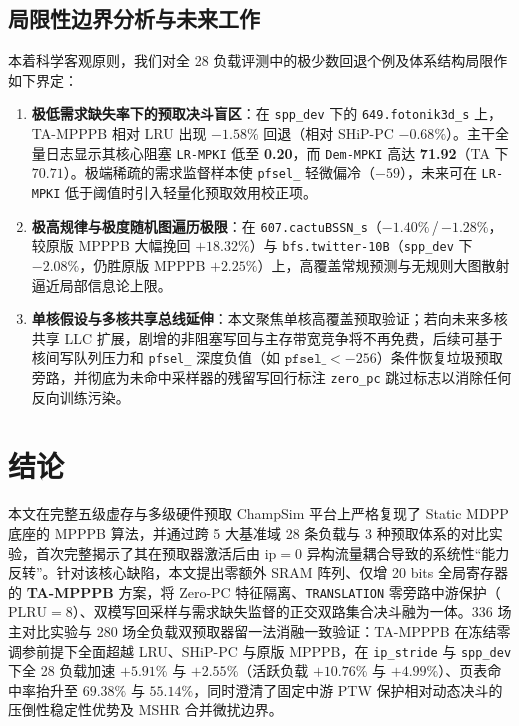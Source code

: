 \documentclass[10.5pt,compsoc,UTF8]{CjC}
\begin{document}
\subsection{局限性边界分析与未来工作}

本着科学客观原则，我们对全 28 负载评测中的极少数回退个例及体系结构局限作如下界定：
\begin{enumerate}
  \item \textbf{极低需求缺失率下的预取决斗盲区}：在 \texttt{spp\_dev} 下的 \texttt{649.\allowbreak fotonik3d\_s} 上，TA-MPPPB 相对 LRU 出现 $-1.58\%$ 回退（相对 SHiP-PC $-0.68\%$）。主干全量日志显示其核心阻塞 \texttt{LR-MPKI} 低至 \textbf{0.20}，而 \texttt{Dem-MPKI} 高达 \textbf{71.92}（TA 下 $70.71$）。极端稀疏的需求监督样本使 \texttt{pfsel\_} 轻微偏冷（$-59$），未来可在 \texttt{LR-MPKI} 低于阈值时引入轻量化预取效用校正项。
  \item \textbf{极高规律与极度随机图遍历极限}：在 \texttt{607.\allowbreak cactuBSSN\_s}（\mbox{$-1.40\%$}\,/\,\mbox{$-1.28\%$}，较原版 MPPPB 大幅挽回 $+18.32\%$）与 \texttt{bfs.\allowbreak twitter-10B}（\texttt{spp\_dev} 下 $-2.08\%$，仍胜原版 MPPPB $+2.25\%$）上，高覆盖常规预测与无规则大图散射逼近局部信息论上限。
  \item \textbf{单核假设与多核共享总线延伸}：本文聚焦单核高覆盖预取验证；若向未来多核共享 LLC 扩展，剧增的非阻塞写回与主存带宽竞争将不再免费，后续可基于核间写队列压力和 \texttt{pfsel\_} 深度负值（如 $\texttt{pfsel\_}<-256$）条件恢复垃圾预取旁路，并彻底为未命中采样器的残留写回行标注 \texttt{zero\_pc} 跳过标志以消除任何反向训练污染。
\end{enumerate}

\section{结\quad 论}

本文在完整五级虚存与多级硬件预取 ChampSim 平台上严格复现了 Static MDPP 底座的 MPPPB 算法，并通过跨 5 大基准域 28 条负载与 3 种预取体系的对比实验，首次完整揭示了其在预取器激活后由 $\mathrm{ip}=0$ 异构流量耦合导致的系统性“能力反转”。针对该核心缺陷，本文提出零额外 SRAM 阵列、仅增 20 bits 全局寄存器的 \textbf{TA-MPPPB} 方案，将 Zero-PC 特征隔离、\texttt{TRANSLATION} 零旁路中游保护（$\mathrm{PLRU}=8$）、双模写回采样与需求缺失监督的正交双路集合决斗融为一体。336 场主对比实验与 280 场全负载双预取器留一法消融一致验证：TA-MPPPB 在冻结零调参前提下全面超越 LRU、SHiP-PC 与原版 MPPPB，在 \texttt{ip\_stride} 与 \texttt{spp\_dev} 下全 28 负载加速 $+5.91\%$ 与 $+2.55\%$（活跃负载 $+10.76\%$ 与 $+4.99\%$）、页表命中率抬升至 $69.38\%$ 与 $55.14\%$，同时澄清了固定中游 PTW 保护相对动态决斗的压倒性稳定性优势及 MSHR 合并微扰边界。
\end{document}
